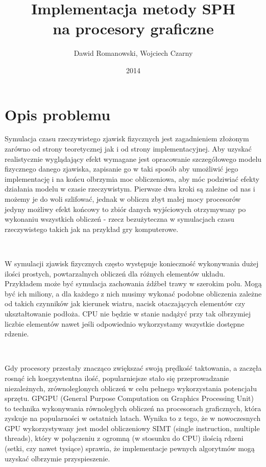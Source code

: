 \documentclass[polish, 12pt]{aghthesis}
\author{Dawid Romanowski, Wojciech Czarny}
\title{Implementacja metody SPH \\ na procesory graficzne}
\date{2014}
\begin{document}
\maketitle{}
\tableofcontents
\clearpage


\section{Opis problemu}

	Symulacja czasu rzeczywistego zjawisk fizycznych jest zagadnieniem złożonym zarówno od strony teoretycznej jak i od strony implementacyjnej. Aby uzyskać realistycznie wyglądający efekt wymagane jest opracowanie szczegółowego modelu fizycznego danego zjawiska, zapisanie go w taki sposób aby umożliwić jego implementację i na końcu olbrzymia moc obliczeniowa, aby móc podziwiać efekty działania modelu w czasie rzeczywistym. Pierwsze dwa kroki są zależne od nas i możemy je do woli szlifować, jednak w obliczu zbyt małej mocy procesorów jedyny możliwy efekt końcowy to zbiór danych wyjściowych otrzymywany po wykonaniu wszystkich obliczeń - rzecz bezużyteczna w symulacjach czasu rzeczywistego takich jak na przykład gry komputerowe.
	
	$\,$

	W symulacji zjawisk fizycznych często występuje konieczność wykonywania dużej ilości prostych, powtarzalnych obliczeń dla różnych elementów układu. Przykładem może być symulacja zachowania źdźbeł trawy w szerokim polu. Mogą być ich miliony, a dla każdego z nich musimy wykonać podobne obliczenia zależne od takich czynników jak kierunek wiatru, nacisk otaczających elementów czy ukształtowanie podłoża. CPU nie będzie w stanie nadążyć przy tak olbrzymiej liczbie elementów nawet jeśli odpowiednio wykorzystamy wszystkie dostępne rdzenie. 
	
	$\,$

		Gdy procesory przestały znacząco zwiększać swoją prędkość taktowania, a zaczęła rosnąć ich koegzystentna ilość, popularniejsze stało się przeprowadzanie niezależnych, zrównoleglonych obliczeń w celu pełnego wykorzystania potencjału sprzętu. GPGPU (General Purpose Computation on Graphics Processing Unit) to technika wykonywania równoległych obliczeń na procesorach graficznych, która zyskuje na popularności w ostatnich latach. Wynika to z tego, że w nowoczesnych GPU wykorzystywany jest model obliczeniowy SIMT (single instruction, multiple threads), który w połączeniu z ogromną (w stosunku do CPU) ilością rdzeni (setki, czy nawet tysiące) sprawia, że implementacje pewnych algorytmów mogą uzyskać olbrzymie przyspieszenie.
\end{document}
